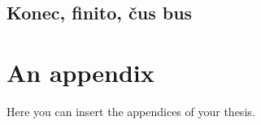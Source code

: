 \documentclass[
  digital,     %
  twoside,     %
  lof,         %
  lot,         %
]{fithesis4}
\begin{document}
\section{Konec, finito, čus bus}

\printbibliography[heading=bibintoc] %

  \makeatletter\thesis@blocks@clear\makeatother
  \printindex

\appendix %
\chapter{An appendix}
Here you can insert the appendices of your thesis.
\end{document}
